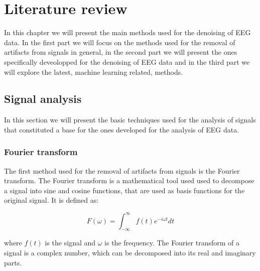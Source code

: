 \documentclass[a4paper, noexaminfo]{sapthesis}
\begin{document}
\chapter{Literature review}
In this chapter we will present the main methods used for the denoising
of EEG data. In the first part we will focus on the methods used for the
removal of artifacts from signals in general, in the second part we will
present the ones specifically deveolopped for the denoising of EEG data and in the third
part we will explore the latest, machine learning related, methods.
\section{Signal analysis}
In this section we will present the basic techniques used for the analysis
of signals that 
constituted a base for the ones developed for the analysis of EEG data.
\subsection{Fourier transform}\label{sec:fourier}
The first method used for the removal of artifacts from signals is the
Fourier transform\cite{fourier}. The Fourier transform is a mathematical tool used
 used to decompose a signal into sine and cosine functions, that are 
used as basis functions for the original signal.
It is defined as:

\begin{equation}\label{eq:fourier}
F(\omega) = \int_{-\infty}^{\infty} f(t) e^{-i\omega t} dt
\end{equation}

where $f(t)$ is the signal and $\omega$ is the frequency. The Fourier
transform of a signal is a complex number, which can be decomposed into
its real and imaginary parts. 
\end{document}
